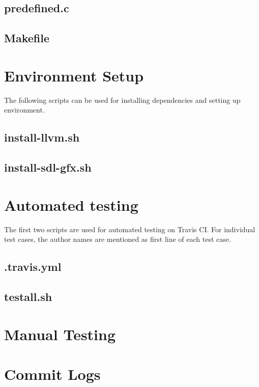 \documentclass[letterpaper,12pt]{report}
\begin{document}
\begin{appendices}
    \section{predefined.c}
    

    \section{Makefile}
    


\chapter{Environment Setup}

The following scripts can be used for installing dependencies and setting up environment.

    \section{install-llvm.sh}
    

    \section{install-sdl-gfx.sh}
    

\chapter{Automated testing}\label{test-suite}

The first two scripts are used for automated testing on Travis CI. For individual test cases, the author names are mentioned as first line of each test case.

    \section{.travis.yml}
    

    \section{testall.sh}
    

    

\chapter{Manual Testing}\label{mnl-test}

  

\chapter{Commit Logs} \label{git:log}
  

\end{appendices}
\end{document}
